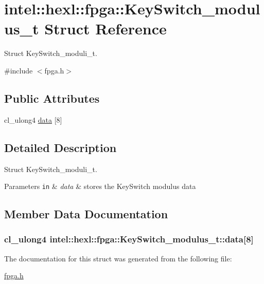 \hypertarget{structintel_1_1hexl_1_1fpga_1_1KeySwitch__modulus__t}{\section{intel\-:\-:hexl\-:\-:fpga\-:\-:Key\-Switch\-\_\-modulus\-\_\-t Struct Reference}
\label{structintel_1_1hexl_1_1fpga_1_1KeySwitch__modulus__t}
}


Struct Key\-Switch\-\_\-moduli\-\_\-t.  




{\ttfamily \#include $<$fpga.\-h$>$}

\subsection*{Public Attributes}
\begin{DoxyCompactItemize}
\item 
cl\-\_\-ulong4 \hyperlink{structintel_1_1hexl_1_1fpga_1_1KeySwitch__modulus__t_a9fc7e308b64e6f993e98062a251344d4}{data} \mbox{[}8\mbox{]}
\end{DoxyCompactItemize}


\subsection{Detailed Description}
Struct Key\-Switch\-\_\-moduli\-\_\-t. 


\begin{DoxyParams}[1]{Parameters}
\mbox{\tt in}  & {\em data} & stores the Key\-Switch modulus data \\
\hline
\end{DoxyParams}


\subsection{Member Data Documentation}
\hypertarget{structintel_1_1hexl_1_1fpga_1_1KeySwitch__modulus__t_a9fc7e308b64e6f993e98062a251344d4}{
\subsubsection[{data}]{\setlength{\rightskip}{0pt plus 5cm}cl\-\_\-ulong4 intel\-::hexl\-::fpga\-::\-Key\-Switch\-\_\-modulus\-\_\-t\-::data\mbox{[}8\mbox{]}}}\label{structintel_1_1hexl_1_1fpga_1_1KeySwitch__modulus__t_a9fc7e308b64e6f993e98062a251344d4}


The documentation for this struct was generated from the following file\-:\begin{DoxyCompactItemize}
\item 
\hyperlink{fpga_8h}{fpga.\-h}\end{DoxyCompactItemize}
